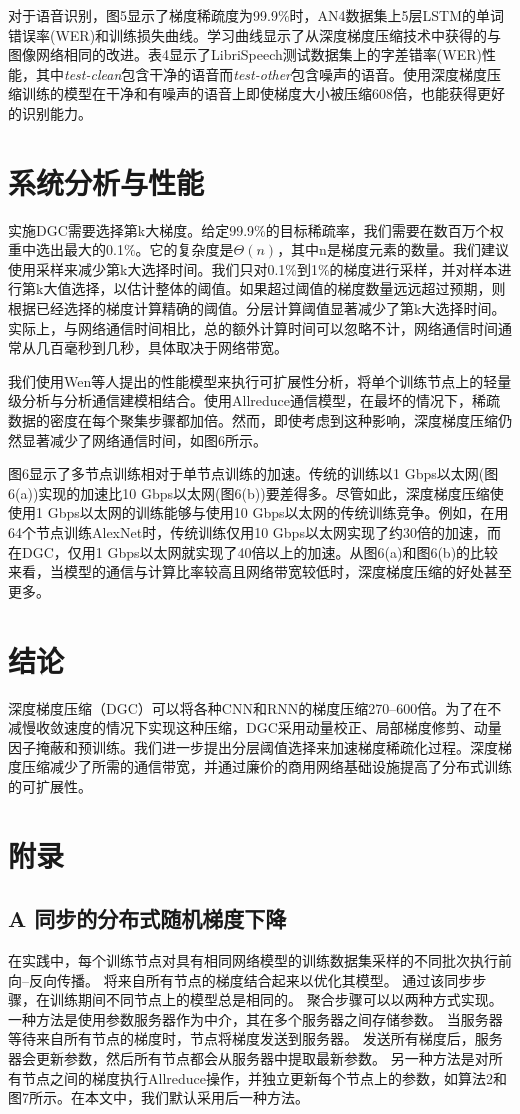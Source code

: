 对于语音识别，图5显示了梯度稀疏度为99.9\%时，AN4数据集上5层LSTM的单词错误率(WER)和训练损失曲线。学习曲线显示了从深度梯度压缩技术中获得的与图像网络相同的改进。表4显示了LibriSpeech测试数据集上的字差错率(WER)性能，其中\textit{test-clean}包含干净的语音而\textit{test-other}包含噪声的语音。使用深度梯度压缩训练的模型在干净和有噪声的语音上即使梯度大小被压缩608倍，也能获得更好的识别能力。

\section{系统分析与性能}
实施DGC需要选择第k大梯度。给定99.9\%的目标稀疏率，我们需要在数百万个权重中选出最大的0.1\%。它的复杂度是$\Theta(n)$，其中n是梯度元素的数量。我们建议使用采样来减少第k大选择时间。我们只对0.1\%到1\%的梯度进行采样，并对样本进行第k大值选择，以估计整体的阈值。如果超过阈值的梯度数量远远超过预期，则根据已经选择的梯度计算精确的阈值。分层计算阈值显著减少了第k大选择时间。实际上，与网络通信时间相比，总的额外计算时间可以忽略不计，网络通信时间通常从几百毫秒到几秒，具体取决于网络带宽。

我们使用Wen等人提出的性能模型来执行可扩展性分析，将单个训练节点上的轻量级分析与分析通信建模相结合。使用Allreduce通信模型，在最坏的情况下，稀疏数据的密度在每个聚集步骤都加倍。然而，即使考虑到这种影响，深度梯度压缩仍然显著减少了网络通信时间，如图6所示。

图6显示了多节点训练相对于单节点训练的加速。传统的训练以1 Gbps以太网(图6(a))实现的加速比10 Gbps以太网(图6(b))要差得多。尽管如此，深度梯度压缩使使用1 Gbps以太网的训练能够与使用10 Gbps以太网的传统训练竞争。例如，在用64个节点训练AlexNet时，传统训练仅用10 Gbps以太网实现了约30倍的加速，而在DGC，仅用1 Gbps以太网就实现了40倍以上的加速。从图6(a)和图6(b)的比较来看，当模型的通信与计算比率较高且网络带宽较低时，深度梯度压缩的好处甚至更多。

\section{结论}
深度梯度压缩（DGC）可以将各种CNN和RNN的梯度压缩270--600倍。为了在不减慢收敛速度的情况下实现这种压缩，DGC采用动量校正、局部梯度修剪、动量因子掩蔽和预训练。我们进一步提出分层阈值选择来加速梯度稀疏化过程。深度梯度压缩减少了所需的通信带宽，并通过廉价的商用网络基础设施提高了分布式训练的可扩展性。

\section{附录}
\subsection{A 同步的分布式随机梯度下降}
在实践中，每个训练节点对具有相同网络模型的训练数据集采样的不同批次执行前向--反向传播。 将来自所有节点的梯度结合起来以优化其模型。 通过该同步步骤，在训练期间不同节点上的模型总是相同的。 聚合步骤可以以两种方式实现。 一种方法是使用参数服务器作为中介，其在多个服务器之间存储参数。 当服务器等待来自所有节点的梯度时，节点将梯度发送到服务器。 发送所有梯度后，服务器会更新参数，然后所有节点都会从服务器中提取最新参数。 另一种方法是对所有节点之间的梯度执行Allreduce操作，并独立更新每个节点上的参数，如算法2和图7所示。在本文中，我们默认采用后一种方法。

